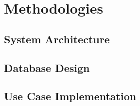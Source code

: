 \documentclass{article}
\makeatletter
\newcommand\subsubsubsection{\@startsection{paragraph}{4}{\z@}{-2.5ex\@plus -1ex \@minus -.25ex}{1.25ex \@plus .25ex}{\normalfont\normalsize\bfseries}}
\makeatother
\begin{document}








\section{Methodologies}
\subsection{System Architecture}
\subsection{Database Design}
\subsection{Use Case Implementation}


\end{document}
